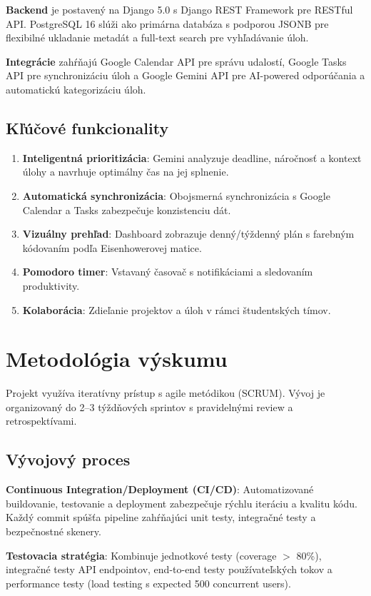 \documentclass[10pt,twocolumn,twoside,slovak,a4paper]{article}
\begin{document}
\textbf{Backend} je postavený na Django 5.0 s Django REST Framework pre RESTful API. PostgreSQL 16 slúži ako primárna databáza s podporou JSONB pre flexibilné ukladanie metadát a full-text search pre vyhľadávanie úloh.

\textbf{Integrácie} zahŕňajú Google Calendar API pre správu udalostí, Google Tasks API pre synchronizáciu úloh a Google Gemini API pre AI-powered odporúčania a automatickú kategorizáciu úloh.

\subsection{Kľúčové funkcionality}

\begin{enumerate}
\item \textbf{Inteligentná prioritizácia}: Gemini analyzuje deadline, náročnosť a kontext úlohy a navrhuje optimálny čas na jej splnenie.
\item \textbf{Automatická synchronizácia}: Obojsmerná synchronizácia s Google Calendar a Tasks zabezpečuje konzistenciu dát.
\item \textbf{Vizuálny prehľad}: Dashboard zobrazuje denný/týždenný plán s farebným kódovaním podľa Eisenhowerovej matice.
\item \textbf{Pomodoro timer}: Vstavaný časovač s notifikáciami a sledovaním produktivity.
\item \textbf{Kolaborácia}: Zdieľanie projektov a úloh v rámci študentských tímov.
\end{enumerate}

\section{Metodológia výskumu}

Projekt využíva iteratívny prístup s agile metódikou (SCRUM). Vývoj je organizovaný do 2--3 týždňových sprintov s pravidelnými review a retrospektívami.

\subsection{Vývojový proces}

\textbf{Continuous Integration/Deployment (CI/CD)}: Automatizované buildovanie, testovanie a deployment zabezpečuje rýchlu iteráciu a kvalitu kódu. Každý commit spúšťa pipeline zahŕňajúci unit testy, integračné testy a bezpečnostné skenery.

\textbf{Testovacia stratégia}: Kombinuje jednotkové testy (coverage $>$ 80\%), integračné testy API endpointov, end-to-end testy používateľských tokov a performance testy (load testing s expected 500 concurrent users).
\end{document}
